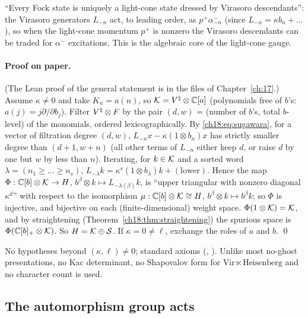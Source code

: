 \begin{physics}
``Every Fock state is uniquely a light-cone state dressed by Virasoro descendants'': the Virasoro
generators $L_{-n}$ act, to leading order, as $p^+\alpha^-_{-n}$ (since $L_{-n}=\kappa b_n+\dots$), so
when the light-cone momentum $p^+$ is nonzero the Virasoro descendants can be traded for $\alpha^-$
excitations.  This is the algebraic core of the light-cone gauge.
\end{physics}

\paragraph{Proof on paper.}  (The Lean proof of the general statement is in the files of Chapter~\ref{ch:17}.)  Assume $\kappa\neq0$ and take $K_n=a(n)$, so $\mathcal{K}={V^{\natural}}\otimes\mathbb C[a]$ (polynomials free of $b$'s:
$a(j)=j\partial/\partial b_j$).  Filter ${V^{\natural}}\otimes F$ by the pair $(d,w)$ = (number of $b$'s, total $b$-level) of
the monomials, ordered lexicographically.  By \eqref{ch18:eq:sugawara}, for a vector of filtration degree
$(d,w)$, $L_{-n}x-\kappa(1\otimes b_n)x$ has strictly smaller degree than $(d+1,w+n)$ (all other terms of
$L_{-n}$ either keep $d$, or raise $d$ by one but $w$ by less than $n$).  Iterating, for $k\in\mathcal{K}$ and a sorted word
$\lambda=(n_1\ge\dots\ge n_s)$, $L_{-\lambda}k=\kappa^s(1\otimes b_\lambda)k+(\text{lower})$.  Hence the map
$\Phi:\mathbb C[b]\otimes\mathcal{K}\to H$, $b^\beta\otimes k\mapsto L_{-\lambda(\beta)}k$, is ``upper triangular with nonzero
diagonal $\kappa^d$'' with respect to the isomorphism $\mu:\mathbb C[b]\otimes\mathcal{K}\cong H$, $b^\beta\otimes k\mapsto
b^\beta k$; so $\Phi$ is injective, and bijective on each (finite-dimensional) weight space.
$\Phi(1\otimes\mathcal{K})=\mathcal{K}$, and by straightening (Theorem~\ref{ch18:thm:straightening}) the spurious space is
$\Phi(\mathbb C[b]_+\otimes\mathcal{K})$.  So $H=\mathcal{K}\oplus\mathcal{S}$.  If $\kappa=0\neq\ell$, exchange the roles of $a$ and $b$. \qed

\begin{status}
No hypotheses beyond $(\kappa,\ell)\neq0$; standard axioms (,
).  Unlike most no-ghost presentations, no Kac determinant,
no Shapovalov form for $\mathrm{Vir}\ltimes\text{Heisenberg}$ and no character count is used.
\end{status}

\subsection{The automorphism group acts}

